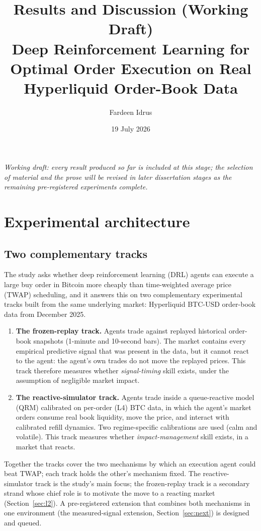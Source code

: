 \documentclass[11pt]{article}
\title{Results and Discussion (Working Draft)\\
\large Deep Reinforcement Learning for Optimal Order Execution on Real Hyperliquid Order-Book Data}
\author{Fardeen Idrus}
\date{19 July 2026}
\begin{document}
\maketitle

\noindent\emph{Working draft: every result produced so far is included at this stage; the
selection of material and the prose will be revised in later dissertation stages as the
remaining pre-registered experiments complete.}

\section{Experimental architecture}\label{sec:arch}

\subsection{Two complementary tracks}

The study asks whether deep reinforcement learning (DRL) agents can execute a large buy
order in Bitcoin more cheaply than time-weighted average price (TWAP) scheduling, and it
answers this on two complementary experimental tracks built from the same underlying market:
Hyperliquid BTC-USD order-book data from December 2025.

\begin{enumerate}
\item \textbf{The frozen-replay track.} Agents trade against replayed historical order-book
snapshots (1-minute and 10-second bars). The market contains every empirical predictive
signal that was present in the data, but it cannot react to the agent: the agent's own
trades do not move the replayed prices. This track therefore measures whether
\emph{signal-timing} skill exists, under the assumption of negligible market impact.
\item \textbf{The reactive-simulator track.} Agents trade inside a queue-reactive model
(QRM) calibrated on per-order (L4) BTC data, in which the agent's market orders consume
real book liquidity, move the price, and interact with calibrated refill dynamics. Two
regime-specific calibrations are used (calm and volatile). This track measures whether
\emph{impact-management} skill exists, in a market that reacts.
\end{enumerate}

Together the tracks cover the two mechanisms by which an execution agent could beat TWAP;
each track holds the other's mechanism fixed. The reactive-simulator track is the study's
main focus; the frozen-replay track is a secondary strand whose chief role is to motivate the
move to a reacting market (Section~\ref{sec:l2}). A pre-registered extension that combines both
mechanisms in one environment (the measured-signal extension, Section~\ref{sec:next}) is
designed and queued.
\end{document}
